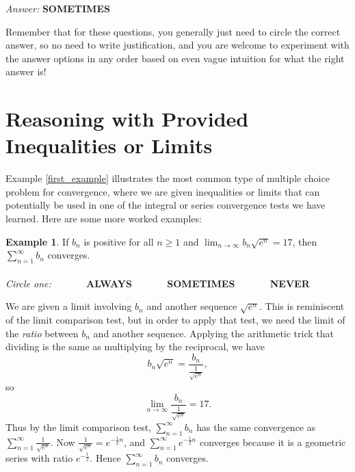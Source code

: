 \documentclass{article}
\theoremstyle{definition} %
\newtheorem{example}{Example} %
\begin{document}
\textit{Answer:} \textbf{SOMETIMES} 

\vspace{20pt}

Remember that for these questions, you generally just need to circle the correct answer, so no need to write justification, and you are welcome to experiment with the answer options in any order based on even vague intuition for what the right answer is!

\section{Reasoning with Provided Inequalities or Limits}

Example \ref{first_example} illustrates the most common type of multiple choice problem for convergence, where we are given inequalities or limits that can potentially be used in one of the integral or series convergence tests we have learned. Here are some more worked examples:

\begin{example}
    If $b_n$ is positive for all $n \geq 1$ and $\displaystyle\lim_{n \to \infty} b_n\sqrt{e^n} = 17$, then $\displaystyle\sum_{n=1}^\infty b_n$ converges. \\\\ 
    \textit{Circle one:} $\quad\quad\quad$ \textbf{ALWAYS} $\quad\quad\quad$ \textbf{SOMETIMES} $\quad\quad\quad$ \textbf{NEVER} 
\end{example}

\vspace{20pt}

We are given a limit involving $b_n$ and another sequence $\sqrt{e^n}$. This is reminiscent of the limit comparison test, but in order to apply that test, we need the limit of the \textit{ratio} between $b_n$ and another sequence. Applying the arithmetic trick that dividing is the same as multiplying by the reciprocal, we have $$b_n\sqrt{e^n} = \frac{b_n}{\frac{1}{\sqrt{e^n}}},$$ so $$\displaystyle\lim_{n \to \infty} \frac{b_n}{\frac{1}{\sqrt{e^n}}} = 17.$$ Thus by the limit comparison test, $\displaystyle\sum_{n=1}^\infty b_n$ has the same convergence as $\displaystyle\sum_{n=1}^\infty \frac{1}{\sqrt{e^n}}$. Now $\frac{1}{\sqrt{e^n}} = e^{-\frac{1}{2}n}$, and $\displaystyle\sum_{n=1}^\infty e^{-\frac{1}{2}n}$ converges because it is a geometric series with ratio $e^{-\frac{1}{2}}$. Hence $\displaystyle\sum_{n=1}^\infty b_n$ converges. 

\vspace{15pt}
\end{document}
